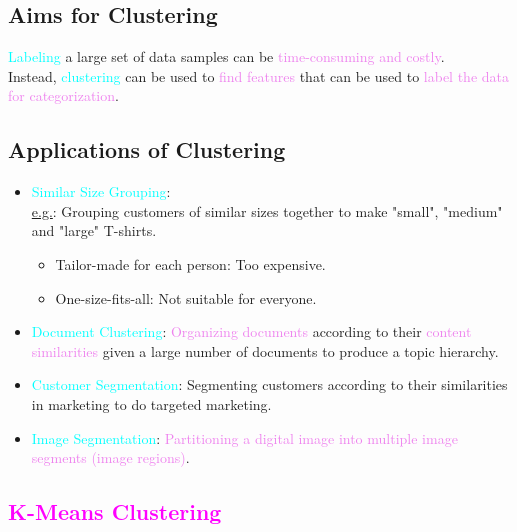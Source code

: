 \documentclass{book}
\begin{document}
\subsection{Aims for Clustering}
\textcolor{cyan}{Labeling} a large set of data samples can be \textcolor{violet}{time-consuming and costly}.\\
Instead, \textcolor{cyan}{clustering} can be used to \textcolor{violet}{find features} that can be used to \textcolor{violet}{label the data for categorization}.\\
\subsection{Applications of Clustering}
\begin{itemize}
    \item \textcolor{cyan}{Similar Size Grouping}: \\
    \underline{e.g.}: Grouping customers of similar sizes together to make "small", "medium" and "large" T-shirts.
    \begin{itemize}
        \item Tailor-made for each person: Too expensive.
        \item One-size-fits-all: Not suitable for everyone.
    \end{itemize}
    \item \textcolor{cyan}{Document Clustering}: \textcolor{violet}{Organizing documents} according to their \textcolor{violet}{content similarities} given a large number of documents to produce a topic hierarchy.
    \item \textcolor{cyan}{Customer Segmentation}: Segmenting customers according to their similarities in marketing to do targeted marketing.
    \item \textcolor{cyan}{Image Segmentation}: \textcolor{violet}{Partitioning a digital image into multiple image segments (image regions)}.
\end{itemize}
\newpage
\textcolor{magenta}{\section{\textbf{K-Means Clustering}}}
\end{document}
